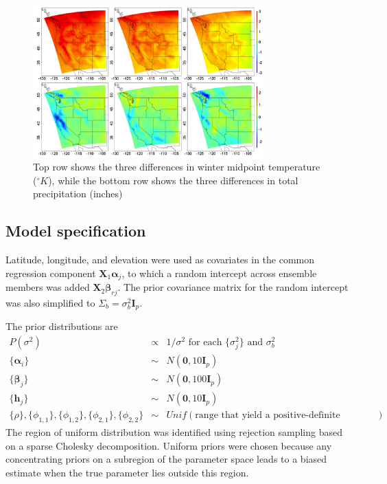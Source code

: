 \documentclass[12pt]{amsart}
\begin{document}
\begin{figure}[H]
    \centering
    \includegraphics[width = 0.8\textwidth]{Fig2.png}
    \caption{Top row shows the three differences in winter midpoint temperature ($^\circ K$), while the bottom row shows the three differences in total precipitation (inches)}
    \label{fig: Fig2}
\end{figure}

\subsection{Model specification}

Latitude, longitude, and elevation were used as covariates in the common regression component $\boldsymbol{X}_1 \boldsymbol{\alpha}_j$, to which a random intercept across ensemble members was added $\boldsymbol{X}_2 \boldsymbol{\beta}_{rj}$. The prior covariance matrix for the random intercept was also simplified to $\Sigma_b = \sigma_b^2\boldsymbol{I}_p$.

The prior distributions are 
\begin{eqnarray*}
    P (\sigma^2 ) &\propto& 1/\sigma^2 \text{ for each } \{\sigma_j^2\} \text{ and } \sigma_b^2 \\
    \{\boldsymbol{\alpha}_i \} &\sim& N(\boldsymbol{0}, 10 \boldsymbol{I}_p) \\
    \{\boldsymbol{\beta}_j \} &\sim& N(\boldsymbol{0}, 100 \boldsymbol{I}_p) \\
    \{\boldsymbol{h}_j \} &\sim& N(\boldsymbol{0}, 10 \boldsymbol{I}_p) \\
    \{\rho \}, \{\phi_{1,1} \}, \{\phi_{1,2}\}, \{\phi_{2, 1} \}, \{\phi_{2,2} \}  &\sim& Unif(\text{range that yield a positive-definite covariance matrix})
\end{eqnarray*}
The region of uniform distribution was identified using rejection sampling based on a sparse Cholesky decomposition. Uniform priors were chosen because any concentrating priors on a subregion of the parameter space leads to a biased estimate when the true parameter lies outside this region.
\end{document}
